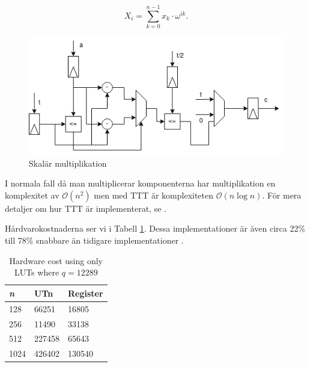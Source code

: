 \documentclass{paper}
\begin{document}
\[ X_i = \sum_{k=0}^{n-1}x_k \cdot \omega^{ik}. \]

\begin{figure}[H]
    \centering
    \includegraphics[scale=0.5]{images/scalar_division.png}
    \caption{Skalär multiplikation}
    \label{fig:pol_mul}
\end{figure}
I normala fall då man multiplicerar komponenterna har multiplikation en
komplexitet av $\mathcal{O}(n^2)$ men med TTT är komplexiteten
$\mathcal{O}(n\log n)$. För mera detaljer om hur TTT är implementerat, se
\citep{FPGA_post_quantum}.

Hårdvarokostnaderna ser vi i Tabell \ref{tab:hardwarecost}. Dessa
implementationer är även circa 22\% till 78\% snabbare än tidigare
implementationer \citep{FPGA_post_quantum}.

\begin{table}[H]
    \centering
    \begin{tabular}{l|ll}
        \textit{n} & UTn   & Register \\ \hline
        128        & 66251  & 16805     \\
        256        & 11490  & 33138     \\
        512        & 227458 & 65643     \\
        1024       & 426402 & 130540
    \end{tabular}
    \caption{Hardware cost using only LUTs where $q = 12289$
    \citep{FPGA_post_quantum}}
    \label{tab:hardwarecost}
\end{table}

\printbibliography
\end{document}

